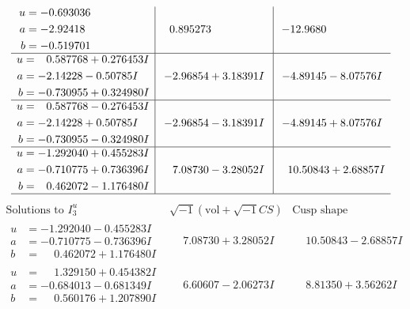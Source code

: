\documentclass[1p]{elsarticle_modified}
\theoremstyle{definition}
\newcommand{\I}{\sqrt{-1}}
\begin{document}
$$\begin{array}{c|c|c}
\begin{aligned}
u &= -0.693036\phantom{ +0.000000I} \\
a &= -2.92418\phantom{ +0.000000I} \\
b &= -0.519701\phantom{ +0.000000I}\end{aligned}
 & \phantom{-}0.895273\phantom{ +0.000000I} & -12.9680\phantom{ +0.000000I} \\ \hline\begin{aligned}
u &= \phantom{-}0.587768 + 0.276453 I \\
a &= -2.14228 - 0.50785 I \\
b &= -0.730955 + 0.324980 I\end{aligned}
 & -2.96854 + 3.18391 I & -4.89145 - 8.07576 I \\ \hline\begin{aligned}
u &= \phantom{-}0.587768 - 0.276453 I \\
a &= -2.14228 + 0.50785 I \\
b &= -0.730955 - 0.324980 I\end{aligned}
 & -2.96854 - 3.18391 I & -4.89145 + 8.07576 I \\ \hline\begin{aligned}
u &= -1.292040 + 0.455283 I \\
a &= -0.710775 + 0.736396 I \\
b &= \phantom{-}0.462072 - 1.176480 I\end{aligned}
 & \phantom{-}7.08730 - 3.28052 I & \phantom{-}10.50843 + 2.68857 I\\
 \hline 
 \end{array}$$\newpage$$\begin{array}{c|c|c}  
\text{Solutions to }I^u_{3}& \I (\text{vol} + \sqrt{-1}CS) & \text{Cusp shape}\\
 \hline 
\begin{aligned}
u &= -1.292040 - 0.455283 I \\
a &= -0.710775 - 0.736396 I \\
b &= \phantom{-}0.462072 + 1.176480 I\end{aligned}
 & \phantom{-}7.08730 + 3.28052 I & \phantom{-}10.50843 - 2.68857 I \\ \hline\begin{aligned}
u &= \phantom{-}1.329150 + 0.454382 I \\
a &= -0.684013 - 0.681349 I \\
b &= \phantom{-}0.560176 + 1.207890 I\end{aligned}
 & \phantom{-}6.60607 - 2.06273 I & \phantom{-}8.81350 + 3.56262 I \\ \hline\begin{aligned}

\end{aligned}
\end{array}$$
\end{document}
